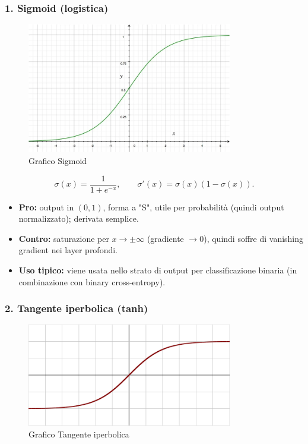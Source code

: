 \documentclass[a4paper,12pt]{report}
\begin{document}
	\subsubsection{1. Sigmoid (logistica)}
	
	\begin{figure}[H]
		\centering
		\includegraphics[width=0.8\textwidth]{img/sigmoid.png}
		\caption{Grafico Sigmoid}
	\end{figure}
	
	\[
	\sigma(x) = \frac{1}{1+e^{-x}},\qquad
	\sigma'(x)=\sigma(x)(1-\sigma(x)).
	\]
	\begin{itemize}
		\item \textbf{Pro:} output in \((0,1)\), forma a "S", utile per probabilità (quindi output normalizzato); derivata semplice.
		\item \textbf{Contro:} saturazione per $x\to\pm\infty$ (gradiente $\to0$), quindi soffre di vanishing gradient nei layer profondi.
		\item \textbf{Uso tipico:} viene usata nello strato di output per classificazione binaria (in combinazione con binary cross-entropy).
	\end{itemize}
	
	\subsubsection{2. Tangente iperbolica (tanh)}
	
	\begin{figure}[H]
		\centering
		\includegraphics[width=0.8\textwidth]{img/tanh.png}
		\caption{Grafico Tangente iperbolica}
	\end{figure}
	
\end{document}
